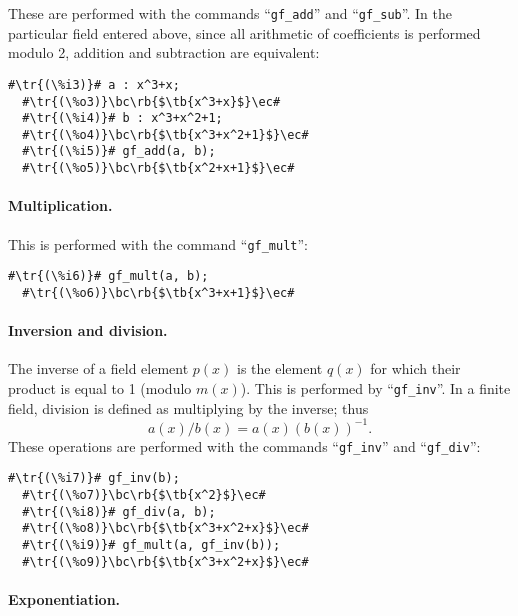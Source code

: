 \documentclass[a4paper,11pt,leqno,fleqn]{artikel3}
\newcommand{\bc}{\begin{center}}
\newcommand{\ec}{\end{center}}
\newcommand{\tr}[1]{\textcolor{red}{#1}}
\newcommand{\tb}[1]{\textcolor{blue}{#1}}
\newcommand{\rb}[1]{\raisebox{2mm}[0mm][1mm]{#1}}
\begin{document}
These are performed with the commands ``\verb!gf_add!'' and ``\verb!gf_sub!''.
In the particular field entered above, since all arithmetic of coefficients is
performed modulo 2, addition and subtraction are equivalent:

\vspace*{2mm}
\begin{lstlisting}[escapechar=\#]
  #\tr{(\%i3)}# a : x^3+x;
  #\tr{(\%o3)}\bc\rb{$\tb{x^3+x}$}\ec#
  #\tr{(\%i4)}# b : x^3+x^2+1;
  #\tr{(\%o4)}\bc\rb{$\tb{x^3+x^2+1}$}\ec#
  #\tr{(\%i5)}# gf_add(a, b);
  #\tr{(\%o5)}\bc\rb{$\tb{x^2+x+1}$}\ec#
\end{lstlisting}


\paragraph{Multiplication.}

This is performed with the command ``\verb!gf_mult!'':

\vspace*{2mm}
\begin{lstlisting}[escapechar=\#]
  #\tr{(\%i6)}# gf_mult(a, b);
  #\tr{(\%o6)}\bc\rb{$\tb{x^3+x+1}$}\ec#
\end{lstlisting}


\paragraph{Inversion and division.}

The inverse of a field element $p(x)$ is the element $q(x)$ for which their
product is equal to 1 (modulo $m(x)$).  This is performed by
``\verb!gf_inv!''.  In a finite field, division is defined as multiplying by
the inverse; thus
\[
a(x)/b(x)=a(x)(b(x))^{-1}.
\]
These operations are performed with the commands ``\verb!gf_inv!'' and
``\verb!gf_div!'':

\vspace*{2mm}
\begin{lstlisting}[escapechar=\#]
  #\tr{(\%i7)}# gf_inv(b);
  #\tr{(\%o7)}\bc\rb{$\tb{x^2}$}\ec#
  #\tr{(\%i8)}# gf_div(a, b);
  #\tr{(\%o8)}\bc\rb{$\tb{x^3+x^2+x}$}\ec#
  #\tr{(\%i9)}# gf_mult(a, gf_inv(b));
  #\tr{(\%o9)}\bc\rb{$\tb{x^3+x^2+x}$}\ec#
\end{lstlisting}


\paragraph{Exponentiation.}
\end{document}
